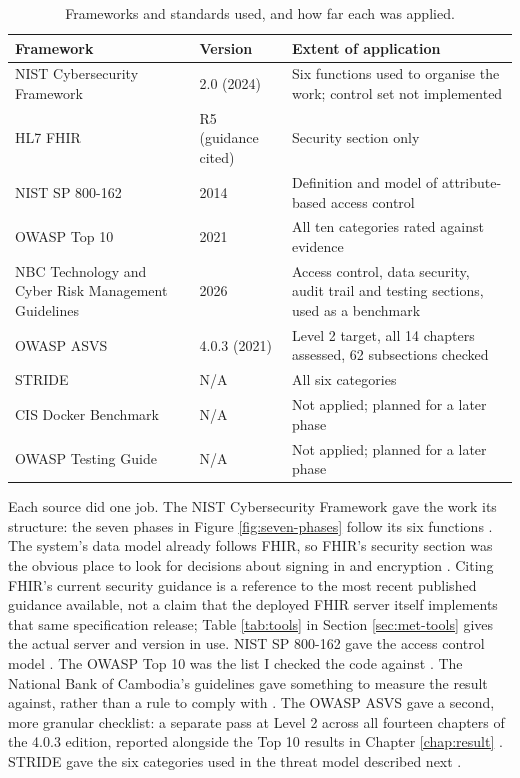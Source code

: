 \begin{table}[H]
\centering
\caption{Frameworks and standards used, and how far each was applied.}
\label{tab:frameworks}
\begin{tabular}{|p{4cm}|p{2cm}|p{7.9cm}|}
\hline
\textbf{Framework} & \textbf{Version} & \textbf{Extent of application} \\
\hline
NIST Cybersecurity Framework & 2.0 (2024) & Six functions used to organise the work; control set not implemented \\
\hline
HL7 FHIR & R5 (guidance cited) & Security section only \\
\hline
NIST SP 800-162 & 2014 & Definition and model of attribute-based access control \\
\hline
OWASP Top 10 & 2021 & All ten categories rated against evidence \\
\hline
NBC Technology and Cyber Risk Management Guidelines & 2026 & Access control, data security, audit trail and testing sections, used as a benchmark \\
\hline
OWASP ASVS & 4.0.3 (2021) & Level 2 target, all 14 chapters assessed, 62 subsections checked \\
\hline
STRIDE & N/A & All six categories \\
\hline
CIS Docker Benchmark & N/A & Not applied; planned for a later phase \\
\hline
OWASP Testing Guide & N/A & Not applied; planned for a later phase \\
\hline
\end{tabular}
\end{table}

Each source did one job. The NIST Cybersecurity Framework gave the work its structure: the seven phases in Figure \ref{fig:seven-phases} follow its six functions \cite{nistcsf2}. The system's data model already follows FHIR, so FHIR's security section was the obvious place to look for decisions about signing in and encryption \cite{hl7fhir}. Citing FHIR's current security guidance is a reference to the most recent published guidance available, not a claim that the deployed FHIR server itself implements that same specification release; Table \ref{tab:tools} in Section \ref{sec:met-tools} gives the actual server and version in use. NIST SP 800-162 gave the access control model \cite{nist80162}. The OWASP Top 10 was the list I checked the code against \cite{owasp2021}. The National Bank of Cambodia's guidelines gave something to measure the result against, rather than a rule to comply with \cite{nbc2026}. The OWASP ASVS gave a second, more granular checklist: a separate pass at Level 2 across all fourteen chapters of the 4.0.3 edition, reported alongside the Top 10 results in Chapter \ref{chap:result} \cite{owaspasvs}. STRIDE gave the six categories used in the threat model described next \cite{stride}.

